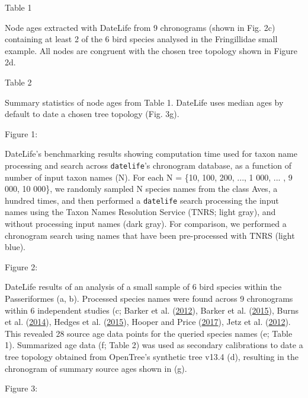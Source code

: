 Table 1

Node ages extracted with DateLife from 9 chronograms (shown in Fig. 2c) containing at least 2 of the 6 bird species analysed in the Fringillidae small example. All nodes are congruent with the chosen tree topology shown in Figure 2d.

Table 2

Summary statistics of node ages from Table 1. DateLife uses median ages by default to date a chosen tree topology (Fig. 3g).

Figure 1:

DateLife's benchmarking results showing computation time used for taxon name processing and search across \texttt{datelife}'s chronogram database, as a function of number of input taxon names (N). For each N = \{10, 100, 200, ..., 1 000, ... , 9 000, 10 000\}, we randomly sampled N species names from the class Aves, a hundred times, and then performed a \texttt{datelife} search processing the input names using the Taxon Names Resolution Service (TNRS; light gray), and without processing input names (dark gray). For comparison, we performed a chronogram search using names that have been pre-processed with TNRS (light blue).

Figure 2:

DateLife results of an analysis of a small sample of 6 bird species within the Passeriformes (a, b). Processed species names were found across 9 chronograms within 6 independent studies (c; Barker et al. (\protect\hyperlink{ref-barker2012going}{2012}), Barker et al. (\protect\hyperlink{ref-barker2015new}{2015}), Burns et al. (\protect\hyperlink{ref-burns2014phylogenetics}{2014}), Hedges et al. (\protect\hyperlink{ref-Hedges2015}{2015}), Hooper and Price (\protect\hyperlink{ref-hooper2017chromosomal}{2017}), Jetz et al. (\protect\hyperlink{ref-Jetz2012}{2012}). This revealed 28 source age data points for the queried species names (e; Table 1). Summarized age data (f; Table 2) was used as secondary calibrations to date a tree topology obtained from OpenTree's synthetic tree v13.4 (d), resulting in the chronogram of summary source ages shown in (g).




Figure 3:

